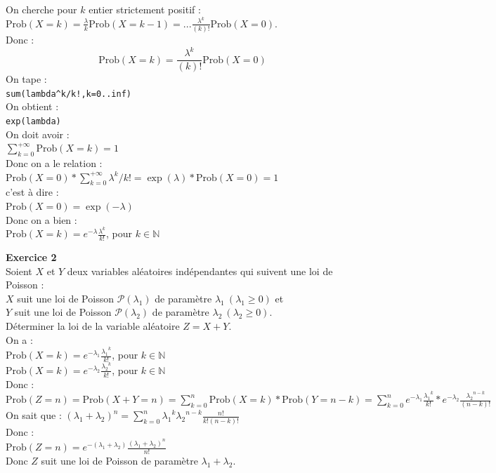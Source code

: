 \documentclass[a4paper,11pt]{book}
\newcommand{\N}{{\mathbb{N}}}
\begin{document}
On cherche pour $k$ entier strictement positif :\\
$\displaystyle \mbox{Prob}(X=k)=\frac{\lambda}{k}\mbox{Prob}(X=k-1)=...
\frac{\lambda^k}{(k)!}\mbox{Prob}(X=0)$.\\
Donc :
$$\mbox{Prob}(X=k)=\frac{\lambda^k}{(k)!}\mbox{Prob}(X=0)$$
On tape  :\\
{\tt sum(lambda\verb|^|k/k!,k=0..inf)}\\
On obtient :\\
{\tt exp(lambda)}\\
On doit avoir :\\
$\sum_{k=0}^{+\infty}\mbox{Prob}(X=k)=1$\\
Donc on a le relation :\\
$\mbox{Prob}(X=0)*\sum_{k=0}^{+\infty}\lambda^k/k!=\exp(\lambda)*\mbox{Prob}(X=0)=1$\\
c'est \`a dire :\\
$\mbox{Prob}(X=0)=\exp(-\lambda)$\\
Donc on a bien :\\
$\displaystyle \mbox{Prob}(X=k)=e^{-\lambda}\frac{\lambda^k}{k!}$, pour $k\in \N$

{\bf Exercice 2}\\
Soient $X$ et $Y$ deux variables al\'eatoires ind\'ependantes qui suivent une 
loi de Poisson :\\
$X$  suit une loi de Poisson 
$\mathcal P(\lambda_1)$ de param\`etre $\lambda_1\ (\lambda_1 \geq 0)$ et\\
$Y$  suit une loi de Poisson 
$\mathcal P(\lambda_2)$ de param\`etre $\lambda_2\ (\lambda_2 \geq 0)$.\\
D\'eterminer la loi de la variable al\'eatoire $Z=X+Y$.\\

On a :\\
$\displaystyle \mbox{Prob}(X=k)=e^{-\lambda_1}\frac{{\lambda_1}^k}{k!}$, pour $k\in \N$\\
$\displaystyle \mbox{Prob}(X=k)=e^{-\lambda_2}\frac{{\lambda_2}^k}{k!}$, pour $k\in \N$\\
Donc :\\
$\displaystyle \mbox{Prob}(Z=n)=\mbox{Prob}(X+Y=n)=\sum_{k=0}^n\mbox{Prob}(X=k)*\mbox{Prob}(Y=n-k)=\sum_{k=0}^ne^{-\lambda_1}\frac{{\lambda_1}^k}{k!}*e^{-\lambda_2}\frac{{\lambda_2}^{n-k}}{(n-k)!}$\\
On sait que :
$\displaystyle (\lambda_1+\lambda_2)^n=\sum_{k=0}^n{\lambda_1}^k{\lambda_2}^{n-k}\frac{n!}{k!(n-k)!}$\\
Donc :\\
$\displaystyle \mbox{Prob}(Z=n)=e^{-(\lambda_1+\lambda_2)}\frac{{(\lambda_1+\lambda_2)}^n}{n!}$\\
Donc $Z$ suit une loi de Poisson de param\`etre $\lambda_1+\lambda_2$.
\end{document}
